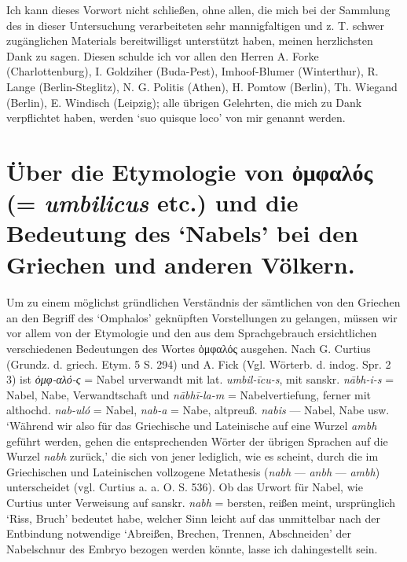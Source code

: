 \documentclass[a4paper, 11pt, oneside]{article}
\begin{document}
Ich kann dieses Vorwort nicht schließen, ohne allen, die mich bei der Sammlung des in dieser Untersuchung verarbeiteten sehr mannigfaltigen und z. T. schwer zugänglichen Materials bereitwilligst unterstützt haben, meinen herzlichsten Dank zu sagen. Diesen schulde ich vor allen den Herren A. Forke (Charlottenburg), I. Goldziher (Buda-Pest), Imhoof-Blumer (Winterthur), R. Lange (Berlin-Steglitz), N. G. Politis (Athen), H. Pomtow (Berlin), Th. Wiegand (Berlin), E. Windisch (Leipzig); alle übrigen Gelehrten, die mich zu Dank verpflichtet haben, werden `suo quisque loco' von mir genannt werden.
\clearpage
\section{Über die Etymologie von ὀμφαλός (= \emph{umbilicus} etc.) und die Bedeutung des `Nabels' bei den Griechen und anderen Völkern.}
\paragraph{}
Um zu einem möglichst gründlichen Verständnis der sämtlichen von den Griechen an den Begriff des `Omphalos' geknüpften Vorstellungen zu gelangen, müssen wir vor allem von der Etymologie und den aus dem Sprachgebrauch ersichtlichen verschiedenen Bedeutungen des Wortes ὀμφαλός ausgehen. Nach G. Curtius (Grundz. d. griech. Etym. 5 S. 294) und A. Fick (Vgl. Wörterb. d. indog. Spr. 2 3) ist \emph{ὀμφ-αλό-ς} = Nabel urverwandt mit lat. \emph{umbil-īcu-s}, mit sanskr. \emph{nābh-i-s} = Nabel, Nabe, Verwandtschaft und \emph{nābhī-la-m} = Nabelvertiefung, ferner mit althochd. \emph{nab-uló} = Nabel, \emph{nab-a} = Nabe, altpreuß. \emph{nabis} --- Nabel, Nabe usw. `Während wir also für das Griechische und Lateinische auf eine Wurzel \emph{ambh} geführt werden, gehen die entsprechenden Wörter der übrigen Sprachen auf die Wurzel \emph{nabh} zurück,' die sich von jener lediglich, wie es scheint, durch die im Griechischen und Lateinischen vollzogene Metathesis (\emph{nabh} --- \emph{anbh} --- \emph{ambh}) unterscheidet (vgl. Curtius a. a. O. S. 536). Ob das Urwort für Nabel, wie Curtius unter Verweisung auf sanskr. \emph{nabh} = bersten, reißen meint, ursprünglich `Riss, Bruch' bedeutet habe, welcher Sinn leicht auf das unmittelbar nach der Entbindung notwendige `Abreißen, Brechen, Trennen, Abschneiden' der Nabelschnur des Embryo bezogen werden könnte, lasse ich dahingestellt sein.
\end{document}
